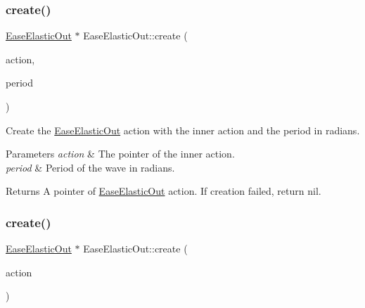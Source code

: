 \mbox{\label{classEaseElasticOut_a417951cd2049c51c27779ed8b7067c42}} 
\subsubsection{\texorpdfstring{create()}{create()}\hspace{0.1cm}{\footnotesize\ttfamily [1/2]}}
{\footnotesize\ttfamily \hyperlink{classEaseElasticOut}{Ease\+Elastic\+Out} $\ast$ Ease\+Elastic\+Out\+::create (\begin{DoxyParamCaption}\item[{\hyperlink{classActionInterval}{Action\+Interval} $\ast$}]{action,  }\item[{float}]{period }\end{DoxyParamCaption})\hspace{0.3cm}{\ttfamily [static]}}



Create the \hyperlink{classEaseElasticOut}{Ease\+Elastic\+Out} action with the inner action and the period in radians. 


\begin{DoxyParams}{Parameters}
{\em action} & The pointer of the inner action. \\
\hline
{\em period} & Period of the wave in radians. \\
\hline
\end{DoxyParams}
\begin{DoxyReturn}{Returns}
A pointer of \hyperlink{classEaseElasticOut}{Ease\+Elastic\+Out} action. If creation failed, return nil. 
\end{DoxyReturn}
\mbox{\label{classEaseElasticOut_a82a88455e85f749ac5d657f898f1b41d}} 
\subsubsection{\texorpdfstring{create()}{create()}\hspace{0.1cm}{\footnotesize\ttfamily [2/2]}}
{\footnotesize\ttfamily \hyperlink{classEaseElasticOut}{Ease\+Elastic\+Out} $\ast$ Ease\+Elastic\+Out\+::create (\begin{DoxyParamCaption}\item[{\hyperlink{classActionInterval}{Action\+Interval} $\ast$}]{action }\end{DoxyParamCaption})\hspace{0.3cm}{\ttfamily [static]}}



